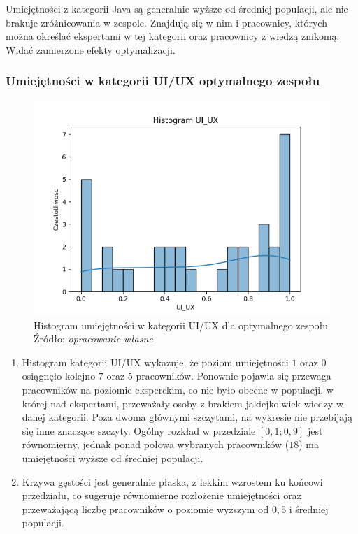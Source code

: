         \par Umiejętności z kategorii Java są generalnie wyższe od średniej populacji, ale nie brakuje zróżnicowania w zespole. Znajdują się w nim i pracownicy, których można określać ekspertami w tej kategorii oraz pracownicy z wiedzą znikomą. Widać zamierzone efekty optymalizacji.
        
        \subsubsection{Umiejętności w kategorii UI/UX optymalnego zespołu}
        \begin{figure}[H]
            \centering
            \includegraphics[width=\linewidth]{chapters/Images/hist_uiux_optimal.png}
            \cprotect\caption{Histogram umiejętności w kategorii UI/UX dla optymalnego zespołu\\ Źródło:\textit{ opracowanie własne}}
            \label{fig:hist_uiux_optimal}
        \end{figure}

        \begin{enumerate}
        \item Histogram kategorii UI/UX wykazuje, że poziom umiejętności $1$ oraz $0$ osiągnęło kolejno $7$ oraz $5$ pracowników. Ponownie pojawia się przewaga pracowników na poziomie eksperckim, co nie było obecne w populacji, w której nad ekspertami, przeważały osoby z brakiem jakiejkolwiek wiedzy w danej kategorii. Poza dwoma głównymi szczytami, na wykresie nie przebijają się inne znaczące szczyty. Ogólny rozkład w przedziale $[0,1; 0,9]$ jest równomierny, jednak ponad połowa wybranych pracowników ($18$) ma umiejętności wyższe od średniej populacji.
        \item Krzywa gęstości jest generalnie płaska, z lekkim wzrostem ku końcowi przedziału, co sugeruje równomierne rozłożenie umiejętności oraz przeważającą liczbę pracowników o poziomie wyższym od $0,5$ i średniej populacji.
        \end{enumerate}

